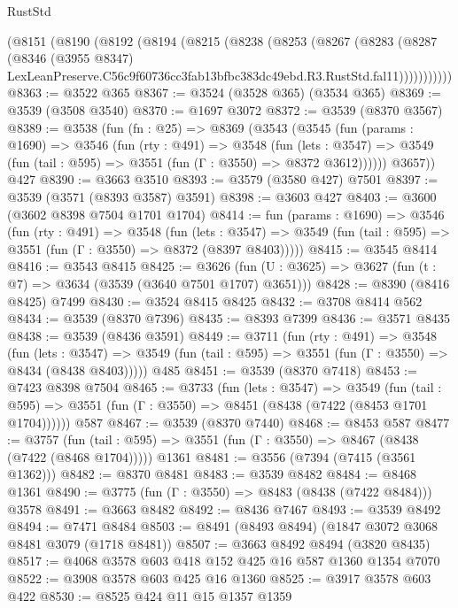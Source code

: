\begin{lexlean}{RustStd}
\begin{coremodule}
    (@8151
      (@8190
        (@8192
          (@8194
            (@8215
              (@8238
                (@8253
                  (@8267
                    (@8283
                      (@8287
                        (@8346
                          (@3955 @8347)
                          LexLeanPreserve.C56c9f60736cc3fab13bfbc383dc49ebd.R3.RustStd.fal11)))))))))))
@8363 := @3522 @365
@8367 := @3524 (@3528 @365) (@3534 @365)
@8369 := @3539 (@3508 @3540)
@8370 := @1697 @3072
@8372 := @3539 (@8370 @3567)
@8389 := @3538
    (fun (fn : @25) =>
    @8369
      (@3543
        (@3545
          (fun (params : @1690) =>
          @3546
            (fun (rty : @491) =>
            @3548
              (fun (lets : @3547) =>
              @3549 (fun (tail : @595) => @3551 (fun (Γ : @3550) => @8372 @3612))))))
        @3657))
    @427
@8390 := @3663 @3510
@8393 := @3579 (@3580 @427) @7501
@8397 := @3539 (@3571 (@8393 @3587) @3591)
@8398 := @3603 @427
@8403 := @3600 (@3602 @8398 @7504 @1701 @1704)
@8414 := fun (params : @1690) =>
  @3546
    (fun (rty : @491) =>
    @3548
      (fun (lets : @3547) =>
      @3549 (fun (tail : @595) => @3551 (fun (Γ : @3550) => @8372 (@8397 @8403)))))
@8415 := @3545 @8414
@8416 := @3543 @8415
@8425 := @3626 (fun (U : @3625) => @3627 (fun (t : @7) => @3634 (@3539 (@3640 @7501 @1707) @3651)))
@8428 := @8390 (@8416 @8425) @7499
@8430 := @3524 @8415 @8425
@8432 := @3708 @8414 @562
@8434 := @3539 (@8370 @7396)
@8435 := @8393 @7399
@8436 := @3571 @8435
@8438 := @3539 (@8436 @3591)
@8449 := @3711
    (fun (rty : @491) =>
    @3548
      (fun (lets : @3547) =>
      @3549 (fun (tail : @595) => @3551 (fun (Γ : @3550) => @8434 (@8438 @8403)))))
    @485
@8451 := @3539 (@8370 @7418)
@8453 := @7423 @8398 @7504
@8465 := @3733
    (fun (lets : @3547) =>
    @3549
      (fun (tail : @595) => @3551 (fun (Γ : @3550) => @8451 (@8438 (@7422 (@8453 @1701 @1704))))))
    @587
@8467 := @3539 (@8370 @7440)
@8468 := @8453 @587
@8477 := @3757
    (fun (tail : @595) => @3551 (fun (Γ : @3550) => @8467 (@8438 (@7422 (@8468 @1704)))))
    @1361
@8481 := @3556 (@7394 (@7415 (@3561 @1362)))
@8482 := @8370 @8481
@8483 := @3539 @8482
@8484 := @8468 @1361
@8490 := @3775 (fun (Γ : @3550) => @8483 (@8438 (@7422 @8484))) @3578
@8491 := @3663 @8482
@8492 := @8436 @7467
@8493 := @3539 @8492
@8494 := @7471 @8484
@8503 := @8491 (@8493 @8494) (@1847 @3072 @3068 @8481 @3079 (@1718 @8481))
@8507 := @3663 @8492 @8494 (@3820 @8435)
@8517 := @4068 @3578 @603 @418 @152 @425 @16 @587 @1360 @1354 @7070
@8522 := @3908 @3578 @603 @425 @16 @1360
@8525 := @3917 @3578 @603 @422
@8530 := @8525 @424 @11 @15 @1357 @1359

\end{coremodule}
\end{lexlean}
